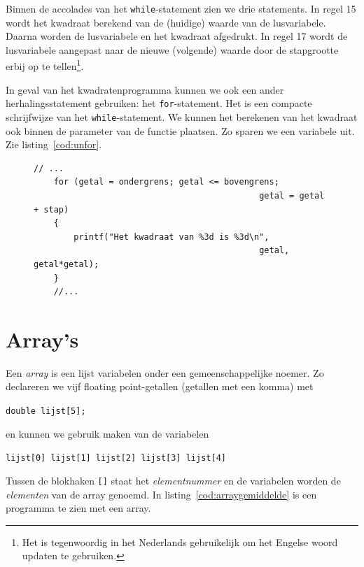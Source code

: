 
Binnen de accolades van het \texttt{while}-statement zien we drie statements. In regel 15 wordt het kwadraat berekend van de (huidige) waarde van de lusvariabele. Daarna worden de lusvariabele en het kwadraat afgedrukt. In regel 17 wordt de lusvariabele aangepast naar de nieuwe (volgende) waarde door de stapgrootte erbij op te tellen\footnote{Het is tegenwoordig in het Nederlands gebruikelijk om het Engelse woord updaten te gebruiken.}.

In geval van het kwadratenprogramma kunnen we ook een ander herhalingsstatement gebruiken: het \texttt{for}-statement. Het is een compacte schrijfwijze van het \texttt{while}-statement. We kunnen het berekenen van het kwadraat ook binnen de parameter van de functie plaatsen. Zo sparen we een variabele uit. Zie listing~\ref{cod:unfor}.

\begin{figure}[!ht]
\begin{lstlisting}[caption=Gebruik van een \texttt{for}-statement.,label=cod:unfor]
    // ...
	for (getal = ondergrens; getal <= bovengrens;
                                             getal = getal + stap)
	{
		printf("Het kwadraat van %3d is %3d\n",
                                             getal, getal*getal);
	}
    //...
\end{lstlisting}
\end{figure}


\section{Array's}
Een \textsl{array} is een lijst variabelen onder een gemeenschappelijke noemer. Zo declareren we vijf floating point-getallen (getallen met een komma) met

\hspace*{1em}\texttt{double lijst[5];}

en kunnen we gebruik maken van de variabelen

\hspace*{1em}\texttt{lijst[0] lijst[1] lijst[2] lijst[3] lijst[4]}

Tussen de blokhaken \texttt{[]}\indexop{[]} staat het \textsl{elementnummer} en de variabelen worden de \textsl{elementen} van de array genoemd. In listing~\ref{cod:arraygemiddelde} is een programma te zien met een array.


